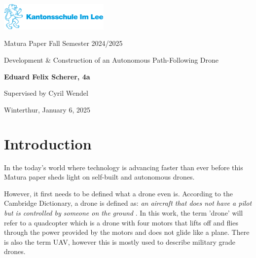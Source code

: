 \documentclass[svgnames]{article}
\begin{document}
\begin{titlepage}

	\begin{center}
	
	\includegraphics[width=0.4\textwidth]{pictures/ksimleelogo}
	\vspace*{17em}
	
	\small
	Matura Paper Fall Semester 2024/2025
	
	\LARGE
	Development \& Construction of an Autonomous Path-Following Drone
	
	\vspace*{0.5em}
	\normalsize
	\textbf{Eduard Felix Scherer, 4a}
	
	Supervised by Cyril Wendel
	\vspace*{\fill}
	
	\normalsize
	Winterthur, January 6, 2025
	\end{center}
\end{titlepage}

\newpage
\tableofcontents

\newpage
	\section{Introduction}
	
	In the today's world where technology is advancing faster than ever before this Matura paper sheds light on self-built and autonomous drones.
	
	However, it first needs to be defined what a drone even is. According to the Cambridge Dictionary, a drone is defined as: \textit{an aircraft that does not have a pilot but is controlled by someone on the ground} \cite{cambridgedrone}. In this work, the term 'drone' will refer to a quadcopter which is a drone with four motors that lifts off and flies through the power provided by the motors and does not glide like a plane. There is also the term \gls{UAV}, however this is mostly used to describe military grade drones.
\end{document}
